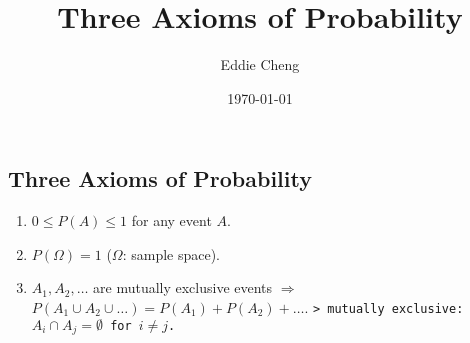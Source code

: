 \documentclass[12pt,a4paper]{article}
\title{Three Axioms of Probability}
\author{Eddie Cheng}
\date{\today}
\begin{document}
\maketitle
\subsection*{Three Axioms of Probability}
\begin{enumerate}
\item $0 \leq P(A) \leq 1$ for any event $A$.
\item $P(\Omega) = 1$ ($\Omega$: sample space).
\item $A_1, A_2, \dots$ are mutually exclusive events $\Rightarrow$ $P(A_1 \cup A_2 \cup \dots) = P(A_1) + P(A_2) + \dots$.
\texttt{> mutually exclusive: $A_i \cap A_j = \emptyset$ for $i \neq j$.}
\end{enumerate}
\end{document}

